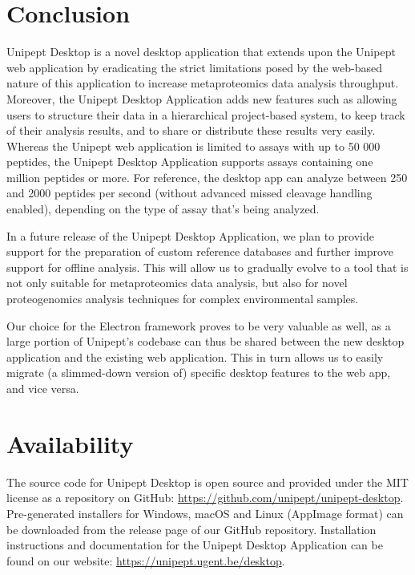 \hypertarget{conclusion}{%
\section{Conclusion}\label{conclusion}}

Unipept Desktop is a novel desktop application that extends upon the
Unipept web application by eradicating the strict limitations posed by
the web-based nature of this application to increase metaproteomics data
analysis throughput. Moreover, the Unipept Desktop Application adds new
features such as allowing users to structure their data in a
hierarchical project-based system, to keep track of their analysis
results, and to share or distribute these results very easily. Whereas
the Unipept web application is limited to assays with up to 50 000
peptides, the Unipept Desktop Application supports assays containing one
million peptides or more. For reference, the desktop app can analyze
between 250 and 2000 peptides per second (without advanced missed
cleavage handling enabled), depending on the type of assay that's being
analyzed.

In a future release of the Unipept Desktop Application, we plan to
provide support for the preparation of custom reference databases and
further improve support for offline analysis. This will allow us to
gradually evolve to a tool that is not only suitable for metaproteomics
data analysis, but also for novel proteogenomics analysis techniques for
complex environmental samples.

Our choice for the Electron framework proves to be very valuable as
well, as a large portion of Unipept's codebase can thus be shared
between the new desktop application and the existing web application.
This in turn allows us to easily migrate (a slimmed-down version of)
specific desktop features to the web app, and vice versa.

\hypertarget{availability}{%
\section{Availability}\label{availability}}

The source code for Unipept Desktop is open source and provided under
the MIT license as a repository on GitHub:
\url{https://github.com/unipept/unipept-desktop}. Pre-generated
installers for Windows, macOS and Linux (AppImage format) can be
downloaded from the release page of our GitHub repository. Installation
instructions and documentation for the Unipept Desktop Application can
be found on our website: \url{https://unipept.ugent.be/desktop}.

